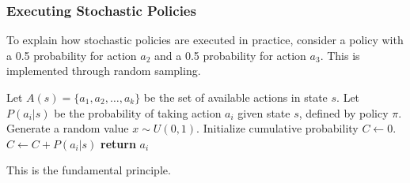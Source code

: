 \documentclass{article}
\begin{document}
\subsubsection*{Executing Stochastic Policies}
To explain how stochastic policies are executed in practice, consider a policy with a 0.5 probability for action $a_2$ and a 0.5 probability for action $a_3$. This is implemented through random sampling.

\begin{algorithm}[H]
    \caption{Stochastic Policy Execution}
    \label{alg:stochastic_policy}
    \begin{algorithmic}[1]
            \State Let $A(s) = \{a_1, a_2, \dots, a_k\}$ be the set of available actions in state $s$.
            \State Let $P(a_i | s)$ be the probability of taking action $a_i$ given state $s$, defined by policy $\pi$.
            \State Generate a random value $x \sim U(0, 1)$.
            \State Initialize cumulative probability $C \gets 0$.
                \State $C \gets C + P(a_i | s)$
                    \State \textbf{return} $a_i$
                \EndIf
            \EndFor
        \EndProcedure
    \end{algorithmic}
\end{algorithm}
This is the fundamental principle.
\end{document}
